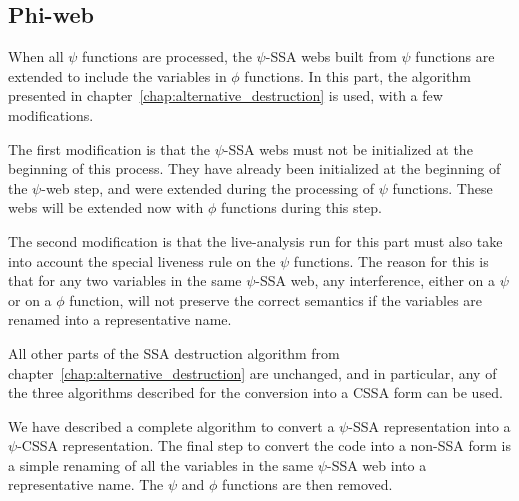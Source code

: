 \subsection{Phi-web}

When all $\psi$ functions are processed, the $\psi$-SSA webs built
from $\psi$ functions are extended to include the variables in $\phi$
functions. In this part, the algorithm presented in
chapter~\ref{chap:alternative_destruction} is used, with a few
modifications.

The first modification is that the $\psi$-SSA webs must not be
initialized at the beginning of this process. They have already been
initialized at the beginning of the $\psi$-web step, and were extended
during the processing of $\psi$ functions. These webs will be extended
now with $\phi$ functions during this step.

The second modification is that the live-analysis run for this part
must also take into account the special liveness rule on the $\psi$
functions. The reason for this is that for any two variables in the
same $\psi$-SSA web, any interference, either on a $\psi$ or on a
$\phi$ function, will not preserve the correct semantics if the
variables are renamed into a representative name.

All other parts of the SSA destruction algorithm from
chapter~\ref{chap:alternative_destruction} are unchanged, and in
particular, any of the three algorithms described for the conversion
into a CSSA form can be used.

We have described a complete algorithm to convert a $\psi$-SSA
representation into a $\psi$-CSSA representation. The final step to
convert the code into a non-SSA form is a simple renaming of all the
variables in the same $\psi$-SSA web into a representative name. The
$\psi$ and $\phi$ functions are then removed.




